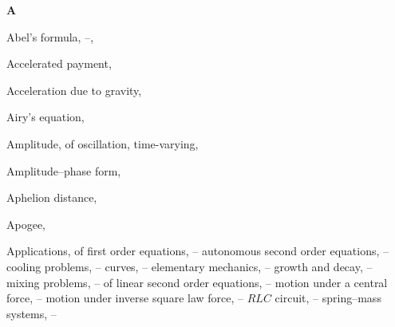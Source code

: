{}

\begin{theindex}
  \newcommand{\alphsep}[1]{\vspace{12pt}

  \item{\bf #1}}
  \alphsep{A}

  \item Abel's formula, \pageref{example:5.1.4}--\pageref{thmtype:5.1.6}, \pageref{thmtype:9.1.3}

  \item Accelerated payment, \pageref{exer:4.1.23}

  \item Acceleration due to gravity, \pageref{eq:4.3.2}

  \item Airy's equation, \pageref{eq:7.2.3}

  \item Amplitude,
    \subitem of oscillation, \pageref{eq:6.1.10}
    \subitem time-varying, \pageref{eq:6.2.3}

  \item Amplitude--phase form, \pageref{example:6.1.2}

  \item Aphelion distance, \pageref{eq:6.4.11}

  \item Apogee, \pageref{eq:6.4.11}

  \item Applications,
    \subitem of first order equations, \pageref{eq:4.1.1}--\pageref{exer:4.5.34}
      \subsubitem autonomous second order equations, \pageref{eq:4.4.1}--\pageref{eq:4.5.1}
      \subsubitem cooling problems, \pageref{eq:4.2.1}--\pageref{eq:4.2.4}
      \subsubitem curves, \pageref{eq:4.5.1}--\pageref{exer:4.5.34}
      \subsubitem elementary mechanics, \pageref{eq:4.3.1}--\pageref{exer:4.4.20}
      \subsubitem growth and decay, \pageref{eq:4.1.1}--\pageref{exer:4.1.27}
      \subsubitem mixing problems, \pageref{example:4.2.3}--\pageref{exer:4.2.23}
    \subitem of linear second order equations, \pageref{eq:6.1.1}--\pageref{exer:6.4.6}
      \subsubitem motion under a central force, \pageref{exer:6.3.17}--\pageref{exer:6.4.6}
      \subsubitem motion under inverse square law force, \pageref{eq:6.4.10}--\pageref{exer:6.4.1}
      \subsubitem $RLC$ circuit, \pageref{exer:6.2.26}--\pageref{exer:6.3.17}
      \subsubitem spring--mass systems, \pageref{eq:6.1.1}--\pageref{exer:6.2.26}


\end{theindex}

